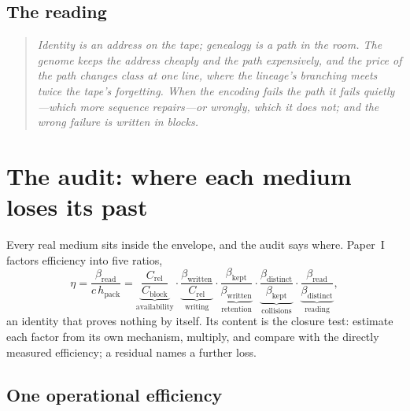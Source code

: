 \documentclass[11pt]{article}
\newcommand{\hpack}{h_{\mathrm{pack}}}
\newcommand{\Crel}{C_{\mathrm{rel}}}
\newcommand{\Cblock}{C_{\mathrm{block}}}
\begin{document}
\subsection*{The reading}
\begin{quote}\itshape
Identity is an address on the tape; genealogy is a path in the room. The genome keeps the address cheaply and the path expensively, and the price of the path changes class at one line, where the lineage's branching meets twice the tape's forgetting. When the encoding fails the path it fails quietly---which more sequence repairs---or wrongly, which it does not; and the wrong failure is written in blocks.
\end{quote}

\section{The audit: where each medium loses its past}

Every real medium sits inside the envelope, and the audit says where. Paper~I factors efficiency into five ratios,
\[
\eta=\frac{\beta_{\mathrm{read}}}{c\,\hpack}
=\underbrace{\frac{\Crel}{\Cblock}}_{\text{availability}}\cdot\underbrace{\frac{\beta_{\mathrm{written}}}{\Crel}}_{\text{writing}}\cdot\underbrace{\frac{\beta_{\mathrm{kept}}}{\beta_{\mathrm{written}}}}_{\text{retention}}\cdot\underbrace{\frac{\beta_{\mathrm{distinct}}}{\beta_{\mathrm{kept}}}}_{\text{collisions}}\cdot\underbrace{\frac{\beta_{\mathrm{read}}}{\beta_{\mathrm{distinct}}}}_{\text{reading}},
\]
an identity that proves nothing by itself. Its content is the closure test: estimate each factor from its own mechanism, multiply, and compare with the directly measured efficiency; a residual names a further loss.

\subsection{One operational efficiency}
\end{document}
